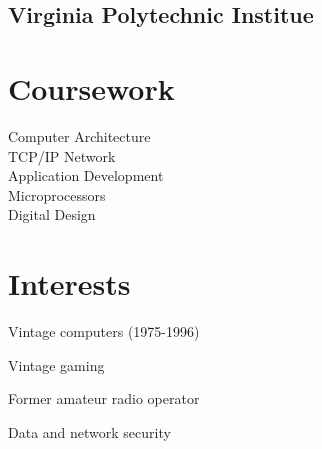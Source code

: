 \documentclass[letterpaper]{deedy-resume}
\begin{document}
\begin{minipage}[t]{0.27\textwidth}
\subsection{Virginia Polytechnic Institue}

\sectionspace

\section{Coursework}
Computer Architecture \\
TCP/IP Network\\
\hspace{3pt} Application Development \\
Microprocessors \\
Digital Design

\sectionspace

\section{Interests}
\vspace{\topsep} %

\begin{tightitemize}
	\item Vintage computers (1975-1996)
	\item Vintage gaming
	\item Former amateur radio operator
	\item Data and network security
\end{tightitemize}

\end{minipage} %
\hfill
%
\end{document}
